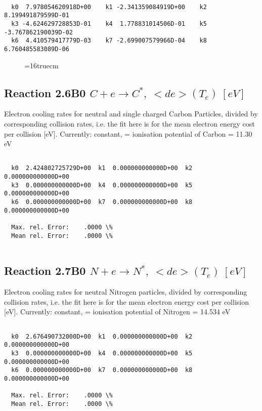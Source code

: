 \documentclass[12pt,dvipdfmx]{article}
\begin{document}
\begin{small}\begin{verbatim}

  k0  7.978054620918D+00    k1 -2.341359084919D+00    k2  8.199491879599D-01
  k3 -4.624629728853D-01    k4  1.778831014506D-01    k5 -3.767862190039D-02
  k6  4.410579417779D-03    k7 -2.699007579966D-04    k8  6.760485583089D-06

\end{verbatim}\end{small}
\begin{figure} \label{2.5ll}
\epsfxsize=16truecm
\end{figure}
\newpage

\subsection{
Reaction 2.6B0   $  C + e  \rightarrow C^*,  \ <de>(T_e) \ [eV] $
}

 Electron cooling rates for neutral and single
 charged Carbon Particles, divided by corresponding collision rates,
i.e. the fit here is for the mean electron energy cost per collision [eV].
 Currently: constant, = ionisation potential of Carbon = 11.30 eV

\begin{small}\begin{verbatim}

  k0  2.424802725729D+00  k1  0.000000000000D+00  k2  0.000000000000D+00
  k3  0.000000000000D+00  k4  0.000000000000D+00  k5  0.000000000000D+00
  k6  0.000000000000D+00  k7  0.000000000000D+00  k8  0.000000000000D+00

  Max. rel. Error:    .0000 \%
  Mean rel. Error:    .0000 \%


\end{verbatim}\end{small}

\subsection{
Reaction 2.7B0   $  N + e  \rightarrow N^*,  \ <de>(T_e) \ [eV] $
}

 Electron cooling rates for neutral Nitrogen particles, divided by corresponding collision rates, i.e. the fit here is for the mean electron energy cost per collision [eV].
 Currently: constant, = ionisation potential of Nitrogen = 14.534 eV

\begin{small}\begin{verbatim}

  k0  2.676490732000D+00  k1  0.000000000000D+00  k2  0.000000000000D+00
  k3  0.000000000000D+00  k4  0.000000000000D+00  k5  0.000000000000D+00
  k6  0.000000000000D+00  k7  0.000000000000D+00  k8  0.000000000000D+00

  Max. rel. Error:    .0000 \%
  Mean rel. Error:    .0000 \%


\end{verbatim}\end{small}
\end{document}
